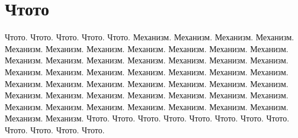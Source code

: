 \section{Чтото}

Чтото. 
Чтото. 
Чтото. 
Чтото. 
Чтото.  Механизм. Механизм. Механизм. Механизм. Механизм.
Механизм. Механизм. Механизм. Механизм. Механизм. Механизм. Механизм. Механизм. 
Механизм. Механизм. Механизм. Механизм. Механизм. Механизм. Механизм. Механизм.
 Механизм. Механизм. Механизм. Механизм. Механизм. Механизм. Механизм. Механизм. 
 Механизм. Механизм. Механизм. Механизм. Механизм. Механизм. Механизм. Механизм.
  Механизм. Механизм. Механизм. Механизм. Механизм. Механизм. Механизм. Механизм. 
  Механизм. Механизм. Механизм.
Чтото. 
Чтото. 
Чтото. 
Чтото. 
Чтото. 
Чтото. 
Чтото. 
Чтото. 
Чтото. 
Чтото. 
Чтото. 
Чтото. 